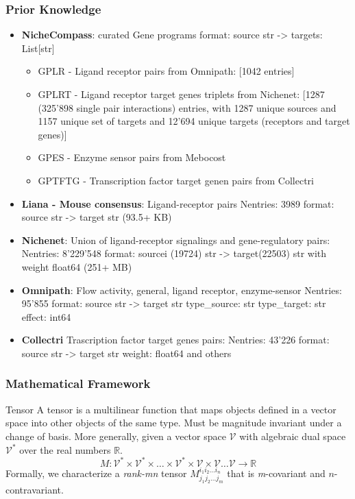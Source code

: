 \documentclass[10pt]{beamer}
\begin{document}
\begin{frame}
    \frametitle{Prior Knowledge}
    \begin{itemize}
        \item \textbf{NicheCompass}: curated Gene programs\break
            format: source str -> targets: List[str]
            \begin{itemize}
                \item GPLR - Ligand receptor pairs from Omnipath: [1042 entries]
                \item GPLRT - Ligand receptor target genes triplets from Nichenet: [1287 (325'898 single pair interactions) entries, with 1287 unique sources and 1157 unique set of targets and 12'694 unique targets (receptors and target genes)]
                \item GPES - Enzyme sensor pairs from Mebocost
                \item GPTFTG - Transcription factor target genen pairs from Collectri
            \end{itemize}
        \item \textbf{Liana - Mouse consensus}: Ligand-receptor pairs\break
            Nentries: 3989 format: source str -> target str (93.5+ KB)
        \item \textbf{Nichenet}: Union of ligand-receptor signalings and gene-regulatory pairs:\break
            Nentries: 8'229'548 format: sourcei (19724) str -> target(22503) str with weight float64 (251+ MB)
        \item \textbf{Omnipath}: Flow activity, general, ligand receptor, enzyme-sensor\break
            Nentries: 95'855 format: source str -> target str type\_source: str type\_target: str effect: int64
        \item \textbf{Collectri} Trascription factor target genes pairs:\break
            Nentries: 43'226 format: source str -> target str weight: float64 and others
    \end{itemize}
\end{frame}    
\begin{frame}
    \frametitle{Mathematical Framework}
    \begin{definition}{Tensor}
        A tensor is a multilinear function that maps objects defined in a vector space into other objects of the same type. Must be magnitude invariant under a change of basis.
        More generally, given a vector space $\mathcal{V}$ with algebraic dual space $\mathcal{V}^*$ over the real numbers $\mathbb{R}$.
        \begin{equation}
            M: \mathcal{V}^* \times \mathcal{V}^* \times \ldots \times \mathcal{V}^* \times \mathcal{V} \times \mathcal{V} \ldots \mathcal{V} \to \mathbb{R}
        \end{equation}
        Formally, we characterize a \textit{rank-mn} tensor $M_{j_1j_2...j_m}^{i_1i_2...i_n}$ that is \textit{m}-covariant and $\textit{n}$-contravariant.
    \end{definition}
\end{frame}
\end{document}
